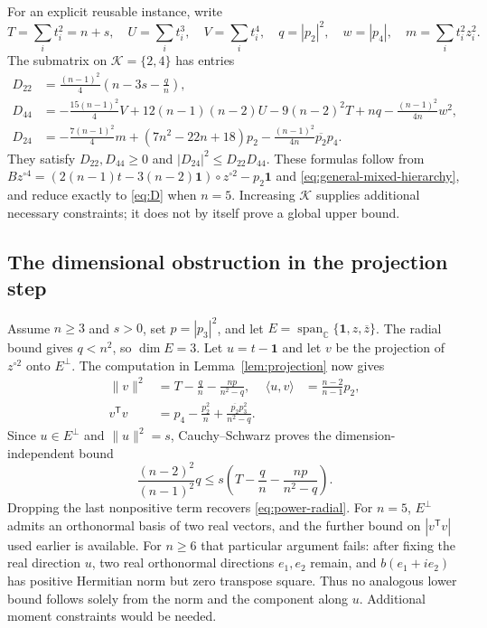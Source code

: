 \documentclass[11pt]{article}
\theoremstyle{remark}
\newcommand{\C}{\mathbb C}
\newcommand{\one}{\mathbf 1}
\newcommand{\norm}[1]{\lVert#1\rVert}
\newcommand{\ip}[2]{\langle#1,#2\rangle}
\numberwithin{equation}{section}
\begin{document}
For an explicit reusable instance, write
\[
 T=\sum_i t_i^2=n+s,\quad U=\sum_i t_i^3,\quad V=\sum_i t_i^4,
 \quad q=|p_2|^2,\quad w=|p_4|,\quad m=\sum_i t_i^2z_i^2.
\]
The submatrix on $\mathcal K=\{2,4\}$ has entries
\begin{equation}\label{eq:general-D24}
\begin{aligned}
 D_{22}&=\frac{(n-1)^2}{4}\left(n-3s-\frac qn\right),\\
 D_{44}&=-\frac{15(n-1)^2}{4}V+12(n-1)(n-2)U
       -9(n-2)^2T+nq-\frac{(n-1)^2}{4n}w^2,\\
 D_{24}&=-\frac{7(n-1)^2}{4}m+(7n^2-22n+18)p_2
       -\frac{(n-1)^2}{4n}\overline{p_2}p_4.
\end{aligned}
\end{equation}
They satisfy $D_{22},D_{44}\ge0$ and
$|D_{24}|^2\le D_{22}D_{44}$.
These formulas follow from
$Bz^{\circ4}=(2(n-1)t-3(n-2)\one)\circ z^{\circ2}-p_2\one$
and \eqref{eq:general-mixed-hierarchy}, and reduce exactly to
\eqref{eq:D} when $n=5$. Increasing $\mathcal K$ supplies additional
necessary constraints; it does not by itself prove a global upper bound.

\subsection{The dimensional obstruction in the projection step}
Assume $n\ge3$ and $s>0$, set $p=|p_3|^2$, and let
$E=\operatorname{span}_{\C}\{\one,z,\overline z\}$.
The radial bound gives $q<n^2$, so $\dim E=3$.
Let $u=t-\one$ and let $v$ be the projection of $z^{\circ2}$ onto
$E^\perp$. The computation in Lemma~\ref{lem:projection} now gives
\begin{equation}\label{eq:general-projection-identities}
\begin{aligned}
 \norm v^2&=T-\frac qn-\frac{np}{n^2-q},&
 \ip u v&=\frac{n-2}{n-1}p_2,\\
 v^{\mathsf T}v&=p_4-\frac{p_2^2}{n}
                  +\frac{\overline{p_2}p_3^2}{n^2-q}.
\end{aligned}
\end{equation}
Since $u\in E^\perp$ and $\norm u^2=s$, Cauchy--Schwarz proves the
dimension-independent bound
\begin{equation}\label{eq:general-projection-CS}
 \frac{(n-2)^2}{(n-1)^2}q
 \le s\left(T-\frac qn-\frac{np}{n^2-q}\right).
\end{equation}
Dropping the last nonpositive term recovers \eqref{eq:power-radial}.
For $n=5$, $E^\perp$ admits an orthonormal basis of two real vectors,
and the further
bound on $|v^{\mathsf T}v|$ used earlier is available.
For $n\ge6$ that particular argument fails: after fixing the real
direction $u$, two real orthonormal directions $e_1,e_2$ remain, and
$b(e_1+i e_2)$ has positive Hermitian norm but zero transpose square.
Thus no analogous lower bound follows solely from the norm and the
component along $u$. Additional moment constraints would be needed.
\end{document}
